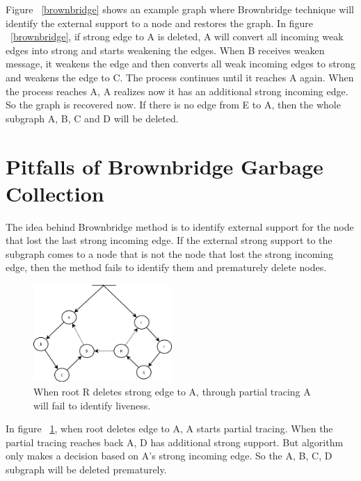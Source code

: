 Figure ~\ref{brownbridge} shows an example graph where Brownbridge technique will identify the external support to a node and restores the graph. In figure ~\ref{brownbridge}, if strong edge to A is deleted, A will convert all incoming weak edges into strong and starts weakening the edges. When B receives weaken message, it weakens the edge and then converts all weak incoming edges to strong and weakens the edge to C. The process continues until it reaches A again. When the process reaches A, A realizes now it has an additional strong incoming edge. So the graph is recovered now. If there is no edge from E to A, then the whole subgraph A, B, C and D will be deleted.


\section{Pitfalls of Brownbridge Garbage Collection}
The idea behind Brownbridge method is to identify external support for the node that lost the last strong incoming edge. If the external strong support to the subgraph comes to a node that is not the node that lost the strong incoming edge, then the method fails to identify them and prematurely delete nodes.  

\begin{figure}[!t]
	\centering
	\includegraphics[width=0.47\textwidth]{figs/brownbridgefail}
	\caption{When root R deletes strong edge to A, through partial tracing A will fail to identify liveness.}
	\label{brownbridgefail}
\end{figure}

In figure ~\ref{brownbridgefail}, when root deletes edge to A, A starts partial tracing. When the partial tracing reaches back A, D has additional strong support. But algorithm only makes a decision based on A's strong incoming edge. So the A, B, C, D subgraph will be deleted prematurely.


